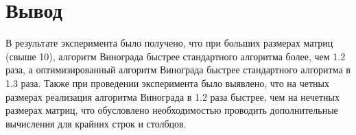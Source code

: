 


\section*{Вывод}

В результате эксперимента было получено, что при больших размерах матриц (свыше 10), алгоритм Винограда быстрее стандартного алгоритма более, чем 1.2 раза, а оптимизированный алгоритм Винограда быстрее стандартного алгоритма в 1.3 раза. Также при проведении эксперимента было выявлено, что на четных размерах реализация алгоритма Винограда в 1.2 раза быстрее, чем на нечетных размерах матриц, что обусловлено необходимостью проводить дополнительные вычисления для крайних строк и столбцов.

